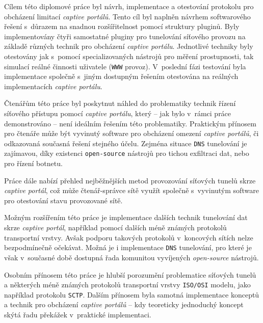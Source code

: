 \documentclass[thesis=M,czech]{FITthesis}[2012/10/20]
\begin{document}
\begin{conclusion}
	Cílem této diplomové práce byl návrh, implementace a otestování protokolu pro obcházení limitací \textit{captive portálů}. Tento cíl byl naplněn návrhem softwarového řešení s~důrazem na snadnou rozšířitelnost pomocí struktury pluginů. Byly implementovány čtyři samostatné pluginy pro tunelování síťového provozu na základě různých technik pro obcházení \textit{captive portálu}. Jednotlivé techniky byly otestovány jak s~pomocí specializovaných nástrojů pro měření prostupnosti, tak simulací reálné činnosti uživatele (\texttt{WWW} provoz). V~poslední fázi testování byla implementace společně s~jiným dostupným řešením otestována na reálných implementacích \textit{captive portálu}.
	
	Čtenářům této práce byl poskytnut náhled do problematiky technik řízení síťového přístupu pomocí \textit{captive portálu}, který -- jak bylo v~rámci práce demonstrováno -- není ideálním řešením této problematiky. Praktickým přínosem pro čtenáře může být vyvinutý software pro obcházení omezení \textit{captive portálů}, či odkazovaná současná řešení stejného účelu. Zejména situace \texttt{DNS} tunelování je zajímavou, díky existenci \texttt{open-source} nástrojů pro tichou exfiltraci dat, nebo pro řízení botnetu.
	
	Práce dále nabízí přehled nejběžnějších metod provozování síťových tunelů skrze \textit{captive portál}, což může čtenář-správce sítě využít společně s~vyvinutým software pro otestování stavu provozované sítě.
	
	Možným rozšířením této práce je implementace dalších technik tunelování dat skrze \textit{captive portál}, například pomocí dalších méně známých protokolů transportní vrstvy. Avšak podporu takových protokolů v~koncových sítích nelze bezpodmínečně očekávat. Možná je i implementace \texttt{DNS} tunelování, pro které je však v~současné době dostupná řada komunitou vyvíjených \textit{open-source} nástrojů.
	
	Osobním přínosem této práce je hlubší porozumění problematice síťových tunelů a některých méně známých protokolů transportní vrstvy \texttt{ISO/OSI} modelu, jako například protokolu \texttt{SCTP}. Dalším přínosem byla samotná implementace konceptů a technik pro obcházení \textit{captive portálů} -- kdy teoreticky jednoduchý koncept skýtá řadu překážek v~praktické implementaci.
\end{conclusion}



\end{document}
